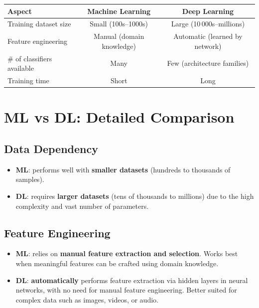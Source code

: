 \documentclass[11pt,a4paper]{article}
\theoremstyle{definition}
\theoremstyle{plain}
\theoremstyle{remark}
\begin{document}
\begin{center}
\renewcommand{\arraystretch}{1.4}
\begin{tabular}{|l|c|c|}
\hline
\textbf{Aspect} & \textbf{Machine Learning} & \textbf{Deep Learning} \\
\hline
Training dataset size & Small (100s--1000s) & Large (10\,000s--millions) \\
\hline
Feature engineering & Manual (domain knowledge) & Automatic (learned by network) \\
\hline
\# of classifiers available & Many & Few (architecture families) \\
\hline
Training time & Short & Long \\
\hline
\end{tabular}
\end{center}

\section{ML vs DL: Detailed Comparison}

\subsection{Data Dependency}

\begin{itemize}
    \item \textbf{ML}: performs well with \textbf{smaller datasets} (hundreds to thousands of samples).
    \item \textbf{DL}: requires \textbf{larger datasets} (tens of thousands to millions) due to the high complexity and vast number of parameters.
\end{itemize}

\subsection{Feature Engineering}

\begin{itemize}
    \item \textbf{ML}: relies on \textbf{manual feature extraction and selection}. Works best when meaningful features can be crafted using domain knowledge.
    \item \textbf{DL}: \textbf{automatically} performs feature extraction via hidden layers in neural networks, with no need for manual feature engineering. Better suited for complex data such as images, videos, or audio.
\end{itemize}
\end{document}
